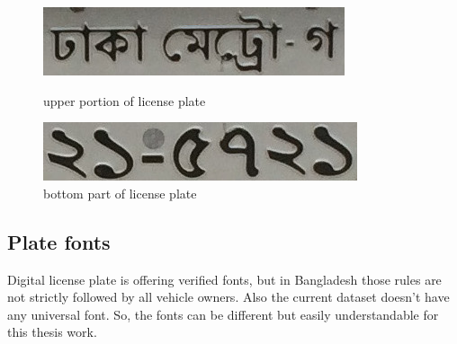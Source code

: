 \documentclass{standalone}
\begin{document}
	\begin{figure}[ht]
    \centering
    \includegraphics[scale=0.8]{./img/up}
    \caption{upper portion of license plate}
	\label{fig:UP}
    
    \includegraphics[scale=0.8]{./img/down}
    \caption{bottom part of license plate}
	\label{fig:DOWN}
    
    \end{figure} 
\subsection{Plate fonts}
Digital license plate is offering verified fonts, but in Bangladesh those rules are not strictly followed by all vehicle owners. Also the current dataset doesn't have any universal font. So, the fonts can be different but easily understandable for this thesis work.
\end{document}
